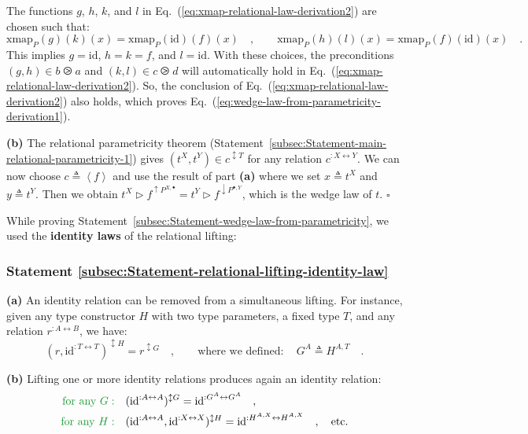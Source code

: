 The functions $g$, $h$, $k$, and $l$ in Eq.~(\ref{eq:xmap-relational-law-derivation2})
are chosen such that:
\[
\text{xmap}_{P}(g)(k)(x)=\text{xmap}_{P}(\text{id})(f)(x)\quad,\quad\quad\text{xmap}_{P}(h)(l)(x)=\text{xmap}_{P}(f)(\text{id})(x)\quad.
\]
This implies $g=\text{id}$, $h=k=f$, and $l=\text{id}$. With these
choices, the preconditions $(g,h)\in b\ogreaterthan a$ and $(k,l)\in c\ogreaterthan d$
will automatically hold in Eq.~(\ref{eq:xmap-relational-law-derivation2}).
So, the conclusion of Eq.~(\ref{eq:xmap-relational-law-derivation2})
also holds, which proves Eq.~(\ref{eq:wedge-law-from-parametricity-derivation1}). 

\textbf{(b)} The relational parametricity theorem (Statement~\ref{subsec:Statement-main-relational-parametricity-1})
gives $(t^{X},t^{Y})\in c^{\updownarrow T}$ for any relation $c^{:X\leftrightarrow Y}$.
We can now choose $c\triangleq\left<f\right>$ and use the result
of part \textbf{(a)} where we set $x\triangleq t^{X}$ and $y\triangleq t^{Y}$.
Then we obtain $t^{X}\triangleright f^{\uparrow P^{X,\bullet}}=t^{Y}\triangleright f^{\downarrow P^{\bullet,Y}}$,
which is the wedge law of $t$. $\square$

While proving Statement~\ref{subsec:Statement-wedge-law-from-parametricity},
we used the \textbf{identity laws}
of the relational lifting:

\subsubsection{Statement \label{subsec:Statement-relational-lifting-identity-law}\ref{subsec:Statement-relational-lifting-identity-law}}

\textbf{(a)} An identity relation can be removed from a simultaneous
lifting. For instance, given any type constructor $H$ with two type
parameters, a fixed type $T$, and any relation $r^{:A\leftrightarrow B}$,
we have: 
\[
(r,\text{id}^{:T\leftrightarrow T})^{\updownarrow H}=r^{\updownarrow G}\quad,\quad\quad\text{where we defined}:\quad G^{A}\triangleq H^{A,T}\quad.
\]

\textbf{(b)} Lifting one or more identity relations produces again
an identity relation: 
\begin{align*}
{\color{greenunder}\text{for any }G:}\quad & (\text{id}^{:A\leftrightarrow A})^{\updownarrow G}=\text{id}^{:G^{A}\leftrightarrow G^{A}}\quad,\\
{\color{greenunder}\text{for any }H:}\quad & (\text{id}^{:A\leftrightarrow A},\text{id}^{:X\leftrightarrow X})^{\updownarrow H}=\text{id}^{:H^{A,X}\leftrightarrow H^{A,X}}\quad,\quad\text{etc}.
\end{align*}


